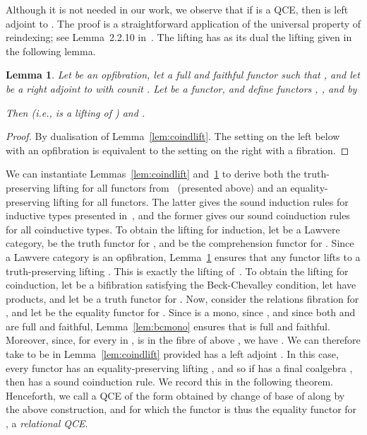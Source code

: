 \documentclass{LMCS}
\theoremstyle{plain}
\newtheorem{lemma}[theorem]{Lemma}
\theoremstyle{remark}
\theoremstyle{definition}
\begin{document}
Although it is not needed in our work, we observe that if  is a QCE,
then  is left adjoint to . The proof is a straightforward
application of the universal property of reindexing; see Lemma~2.2.10
in~\cite{fum12}. The lifting  has as its dual the lifting
 given in the following lemma.

\begin{lemma}\label{lem:indlift}
  Let  be an opfibration, let  a full and
  faithful functor such that , and let  be a
  right adjoint to  with counit . Let  be
  a functor, and define functors , , and  by

Then  (i.e.,  is a lifting of ) and .
\end{lemma}
\begin{proof}
  By dualisation of Lemma~\ref{lem:coindlift}. The setting on the left
  below with  an opfibration is equivalent to the setting on the
  right with  a fibration.
  
\end{proof}

We can instantiate Lemmas~\ref{lem:coindlift} and~\ref{lem:indlift} to
derive both the truth-preserving lifting for all functors
from~\cite{gjf10} (presented above) and an equality-preserving lifting
for all functors. The latter gives the sound induction rules for
inductive types presented in~\cite{gjf10}, and the former gives our
sound coinduction rules for all coinductive types. To obtain the
lifting for induction, let  be a Lawvere category,  be
the truth functor for , and  be the comprehension functor for
. Since a Lawvere category is an opfibration,
Lemma~\ref{lem:indlift} ensures that any functor  lifts
to a truth-preserving lifting . This is exactly the
lifting of~\cite{gjf10}. To obtain the lifting for coinduction, let
 be a bifibration satisfying the Beck-Chevalley
condition, let  have products, and let  be a truth functor for
. Now, consider the relations fibration  for , and let
 be the equality functor for . Since  is a mono, since
, and since both  and 
are full and faithful, Lemma~\ref{lem:bcmono} ensures that  is
full and faithful. Moreover, since, for every  in ,  is
in the fibre of  above , we have . We can therefore take  to be  in
Lemma~\ref{lem:coindlift} provided  has a left adjoint .  In
this case, every functor  has an equality-preserving
lifting , and so if  has a final
coalgebra , then  has a sound coinduction rule. We
record this in the following theorem. Henceforth, we call a QCE of the
form  obtained by change of base of  along  by the
above construction, and for which the functor  is thus the equality
functor for , a {\em relational QCE}.
\end{document}
